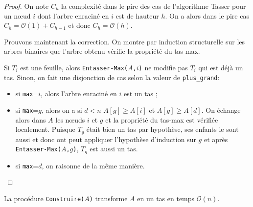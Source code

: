 \begin{proof}
On note $C_h$ la complexité dans le pire des cas de l'algorithme Tasser pour un nœud $i$ dont l'arbre enraciné en $i$ est de hauteur $h$. On a alors dans le pire cas $C_h = \mathcal{O}(1)+C_{h-1}$ et donc $C_h=\mathcal{O}(h)$.

Prouvons maintenant la correction. On montre par induction structurelle sur les arbres binaires que l'arbre obtenu vérifie la propriété du tas-max. 

Si $T_i$ est une feuille, alors {\tt Entasser-Max($A$,$i$)} ne modifie pas $T_i$ qui est déjà un tas. Sinon, on fait une disjonction de cas selon la valeur de \texttt{plus\_grand}:
\begin{itemize}
\item  si \texttt{max}=$i$, alors l'arbre enraciné en $i$ est un tas ;
\item si  \texttt{max}=$g$, alors on a si $d<n$ $A[g]\geq A[i]$ et $A[g] \geq A[d]$. On échange alors dans $A$ les nœuds $i$ et $g$ et la propriété du tas-max est vérifiée localement. Puisque  $T_g$ était bien un tas par hypothèse, ses enfants le sont aussi et donc ont peut appliquer l'hypothèse d'induction sur $g$ et après {\tt Entasser-Max($A$,$g$)}, $T_g$ est aussi un tas.
\item si  \texttt{max}=$d$, on raisonne de la même manière.
\end{itemize}
\end{proof}

\begin{lemma}\label{lemme 2}
La procédure {\tt Construire($A$)} transforme $A$ en un tas en temps $\mathcal{O}(n)$.
\end{lemma}

